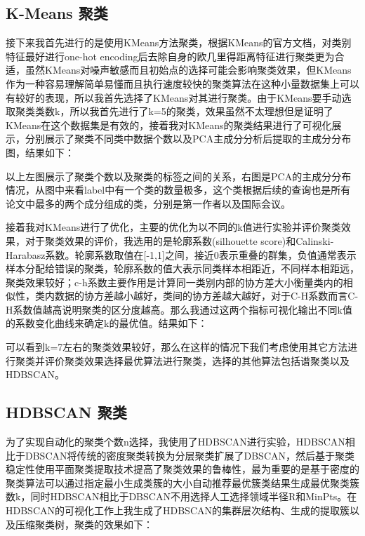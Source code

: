\subsection{K-Means 聚类}

接下来我首先进行的是使用KMeans方法聚类，根据KMeans的官方文档，对类别特征最好进行one-hot encoding后去除自身的欧几里得距离特征进行聚类更为合适，虽然KMeans对噪声敏感而且初始点的选择可能会影响聚类效果，但KMeans作为一种容易理解简单易懂而且执行速度较快的聚类算法在这种小量数据集上可以有较好的表现，所以我首先选择了KMeans对其进行聚类。由于KMeans要手动选取聚类类数k，所以我首先进行了k=5的聚类，效果虽然不太理想但是证明了KMeans在这个数据集是有效的，接着我对KMeans的聚类结果进行了可视化展示，分别展示了聚类不同类中数据个数以及PCA主成分分析后提取的主成分分布图，结果如下：



以上左图展示了聚类个数以及聚类的标签之间的关系，右图是PCA的主成分分布情况，从图中来看label中有一个类的数量极多，这个类根据后续的查询也是所有论文中最多的两个成分组成的类，分别是第一作者以及国际会议。

接着我对KMeans进行了优化，主要的优化为以不同的k值进行实验并评价聚类效果，对于聚类效果的评价，我选用的是轮廓系数(silhouette score)和Calinski-Harabasz系数。轮廓系数取值在[-1,1]之间，接近0表示重叠的群集，负值通常表示样本分配给错误的聚类，轮廓系数的值大表示同类样本相距近，不同样本相距远，聚类效果较好；c-h系数主要作用是计算同一类别内部的协方差大小衡量类内的相似性，类内数据的协方差越小越好，类间的协方差越大越好，对于C-H系数而言C-H系数值越高说明聚类的区分度越高。那么我通过这两个指标可视化输出不同k值的系数变化曲线来确定k的最优值。结果如下：



可以看到k=7左右的聚类效果较好，那么在这样的情况下我们考虑使用其它方法进行聚类并评价聚类效果选择最优算法进行聚类，选择的其他算法包括谱聚类以及HDBSCAN。

\subsection{HDBSCAN 聚类}

为了实现自动化的聚类个数n选择，我使用了HDBSCAN进行实验，HDBSCAN相比于DBSCAN将传统的密度聚类转换为分层聚类扩展了DBSCAN，然后基于聚类稳定性使用平面聚类提取技术提高了聚类效果的鲁棒性，最为重要的是基于密度的聚类算法可以通过指定最小生成类簇的大小自动推荐最优簇类结果生成最优聚类簇数k，同时HDBSCAN相比于DBSCAN不用选择人工选择领域半径R和MinPts。在HDBSCAN的可视化工作上我生成了HDBSCAN的集群层次结构、生成的提取簇以及压缩聚类树，聚类的效果如下：



